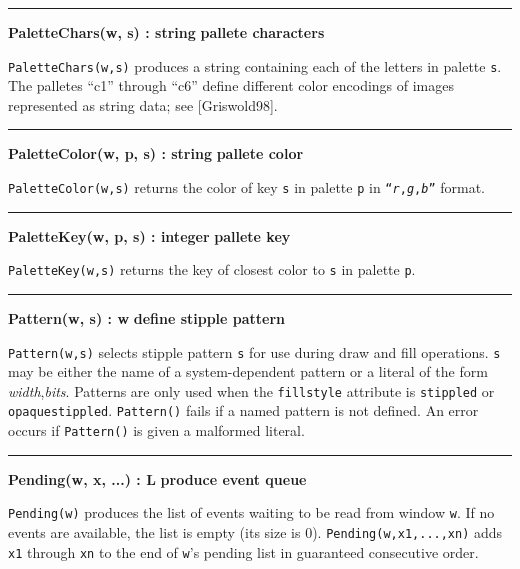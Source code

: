 \bigskip\hrule\vspace{0.1cm}
\noindent
{\bf PaletteChars(w, s) : string } \hfill {\bf pallete characters}

\noindent
\texttt{PaletteChars(w,s)} produces a string containing each of the
letters in palette \texttt{s}. The palletes
{\textquotedblleft}c1{\textquotedblright} through
{\textquotedblleft}c6{\textquotedblright} define different color
encodings of images represented as string data; see [Griswold98].

\bigskip\hrule\vspace{0.1cm}
\noindent
{\bf PaletteColor(w, p, s) : string } \hfill {\bf pallete color}

\noindent
\texttt{PaletteColor(w,s)} returns the color of key \texttt{s} in
palette \texttt{p} in
\texttt{{\textquotedblleft}}\texttt{\textit{r}}\texttt{,}\texttt{\textit{g}}\texttt{,}\texttt{\textit{b}}\texttt{{\textquotedblright}}
format.

\bigskip\hrule\vspace{0.1cm}
\noindent
{\bf PaletteKey(w, p, s) : integer } \hfill {\bf pallete key}

\noindent
\texttt{PaletteKey(w,s)} returns the key of closest color to \texttt{s}
in palette \texttt{p}.

\bigskip\hrule\vspace{0.1cm}
\noindent
{\bf Pattern(w, s) : w } \hfill {\bf define stipple pattern}

\noindent
\texttt{Pattern(w,s)} selects stipple pattern \texttt{s} for use during
draw and fill operations. \texttt{s} may be either the name of a
system-dependent pattern or a literal of the form
\textit{width},\textit{bits}. Patterns are only used when the
\texttt{fillstyle} attribute is \texttt{stippled} or
\texttt{opaquestippled}. \texttt{Pattern()} fails if a named pattern
is not defined. An error occurs if \texttt{Pattern()} is given a
malformed literal.

\bigskip\hrule\vspace{0.1cm}
\noindent
{\bf Pending(w, x, ...) : L } \hfill {\bf produce event queue}

\noindent
\texttt{Pending(w)} produces the list of events waiting to be read from
window \texttt{w}. If no events are available, the list is empty (its
size is 0). \texttt{Pending(w,x1,...,xn)} adds \texttt{x1} through
\texttt{xn} to the end of \texttt{w}'s pending list in
guaranteed consecutive order.

